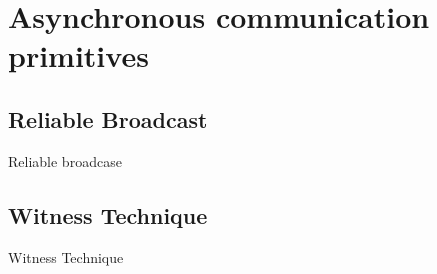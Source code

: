 \section{Asynchronous communication primitives}

\subsection{Reliable Broadcast}
Reliable broadcase
\subsection{Witness Technique}
Witness Technique

